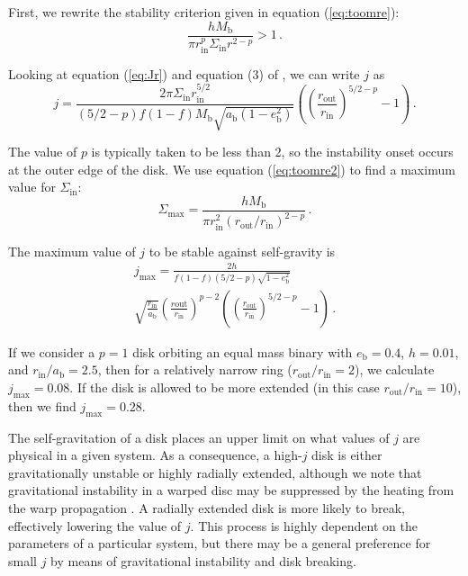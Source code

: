 \documentclass[twocolumn,linenumbers]{aastex631}
\begin{document}
First, we rewrite the stability criterion given in equation (\ref{eq:toomre}):
\begin{equation}
    \label{eq:toomre2}
    \frac{h M_\text{b}}{\pi r_\text{in}^p \Sigma_\text{in} r^{2-p}} > 1\, .
\end{equation}

Looking at equation (\ref{eq:Jr}) and equation (3) of \citet{abod2022}, we can write $j$ as
\begin{equation}
    \label{eq:j-full-disk}
    j = \frac{2\pi \Sigma_\text{in} r_\text{in}^{5/2}}{(5/2-p)f(1-f)M_\text{b}\sqrt{a_\text{b}(1-e_\text{b}^2)}}  \left( \left( \frac{r_\text{out}}{r_\text{in}} \right)^{5/2 - p}- 1\right) \, .
\end{equation}

The value of $p$ is typically taken to be less than 2, so the instability onset occurs at the outer edge of the disk. We use equation (\ref{eq:toomre2}) to find a maximum value for $\Sigma_\text{in}$:
\begin{equation}
    \Sigma_\text{max} = \frac{hM_\text{b}}{\pi r_\text{in}^2 (r_\text{out}/r_\text{in})^{2-p}}\, .
\end{equation}

The maximum value of $j$ to be stable against self-gravity is
\begin{multline}
    \label{eq:jmax-shallow}
    j_\text{max} = \frac{2h}{f (1-f) (5/2 - p)\sqrt{1-e_\text{b}^2}}\\ \sqrt{\frac{r_\text{in}}{a_\text{b}}} \left(\frac{r\text{out}}{r_\text{in}}\right)^{p-2} \left( \left( \frac{r_\text{out}}{r_\text{in}} \right)^{5/2 - p}- 1\right)\, .
\end{multline}

If we consider a $p=1$ disk orbiting an equal mass binary with $e_\text{b}=0.4$, $h=0.01$, and $r_\text{in}/a_\text{b}=2.5$, then for a relatively narrow ring ($r_\text{out}/r_\text{in} = 2$), we calculate $j_\text{max} = 0.08$. If the disk is allowed to be more extended (in this case $r_\text{out}/r_\text{in} = 10$), then we find $j_\text{max} = 0.28$.

The self-gravitation of a disk places an upper limit on what values of $j$ are physical in a given system. As a consequence, a high-$j$ disk is either gravitationally unstable or highly radially extended, although we note that gravitational instability in a warped disc may be suppressed by the heating from the warp propagation \citep{rowther2022}.  A radially extended disk is more likely to break, effectively lowering the value of $j$. This process is highly dependent on the parameters of a particular system, but there may be a general preference for small $j$ by means of gravitational instability and disk breaking.
\end{document}
